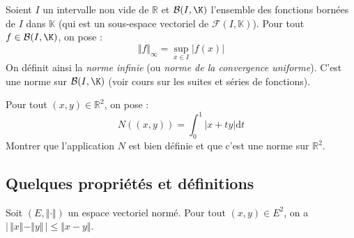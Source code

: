 \documentclass[french,11pt,twoside]{VcCours}
\newcommand{\dt}{\text{d}t}
\begin{document}
Soient $I$ un intervalle non vide de $\mathbb{R}$ et $\mathcal{B}(I,\K)$ l'ensemble des fonctions bornées de $I$ dans $\mathbb{K}$ (qui est un sous-espace vectoriel de $\mathcal{F}(I, \mathbb{K})$). Pour tout $f \in \mathcal{B}(I,\K)$, on pose :
$$ \Vert f \Vert_{\infty} = \sup_{x \in I} \vert f(x) \vert $$
On définit ainsi la \emph{norme infinie} (ou \emph{norme de la convergence uniforme}). C'est une norme sur $\mathcal{B}(I,\K)$ (voir cours sur les suites et séries de fonctions).
%

\begin{ApplicationDirecte}{} Pour tout $(x,y) \in \mathbb{R}^2$, on pose :
$$ N((x,y)) = \int_{0}^1 \vert x+ty \vert \dt$$
Montrer que l'application $N$ est bien définie et que c'est une norme sur $\mathbb{R}^2$.
\end{ApplicationDirecte}
\subsection{Quelques propriétés et définitions}

\begin{Proposition}{} Soit $(E, \Vert \cdot \Vert)$ un espace vectoriel normé. Pour tout $(x,y) \in E^2$, on a $\vert \,  \Vert x \Vert - \Vert y \Vert \, \vert \leq \Vert x-y \Vert$.
\end{Proposition}

\begin{Demonstration}{} 

\vspace*{7cm}
\end{Demonstration}
\end{document}
